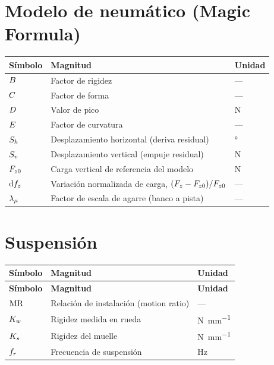 \section*{Modelo de neumático (Magic Formula)}

\begin{center}
\begin{tabular}{@{}p{2.2cm}p{8.5cm}p{2.5cm}@{}}
\toprule
\textbf{Símbolo} & \textbf{Magnitud} & \textbf{Unidad} \\
\midrule
$B$     & Factor de rigidez                          & --- \\
$C$     & Factor de forma                            & --- \\
$D$     & Valor de pico                              & \si{\newton} \\
$E$     & Factor de curvatura                        & --- \\
$S_h$    & Desplazamiento horizontal (deriva residual) & \si{\degree} \\
$S_v$    & Desplazamiento vertical (empuje residual)   & \si{\newton} \\
$F_{z0}$     & Carga vertical de referencia del modelo     & \si{\newton} \\
$\mathrm{d}f_z$     & Variación normalizada de carga, $(F_z-F_{z0})/F_{z0}$ & --- \\
$\lambda_{\mu}$    & Factor de escala de agarre (banco a pista)  & --- \\
\bottomrule
\end{tabular}
\end{center}

\section*{Suspensión}

\begin{longtable}{@{}p{2.2cm}p{8.5cm}p{2.5cm}@{}}
\toprule
\textbf{Símbolo} & \textbf{Magnitud} & \textbf{Unidad} \\
\midrule
\endfirsthead
\toprule
\textbf{Símbolo} & \textbf{Magnitud} & \textbf{Unidad} \\
\midrule
\endhead
$\mathrm{MR}$ & Relación de instalación (motion ratio) & --- \\
$K_w$ & Rigidez medida en rueda                 & \si{\newton\per\milli\meter} \\
$K_s$ & Rigidez del muelle                      & \si{\newton\per\milli\meter} \\
$f_r$ & Frecuencia de suspensión                & \si{\hertz} \\
\bottomrule
\end{longtable}

